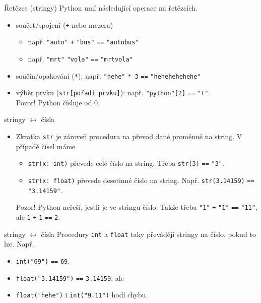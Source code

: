 \begin{frame}{Řetězce (stringy)}
 Python umí následující operace na řetězcích.
 \begin{itemize}
  \item<1-> součet/spojení (\texttt{+} nebo mezera)
   \begin{itemize}
    \item např. \texttt{"auto"} \texttt{+} \texttt{"bus"} \texttt{==}
     \texttt{"autobus"}
    \item např. \texttt{"mrt"} \texttt{"vola"} \texttt{==} \texttt{"mrtvola"}
   \end{itemize}
  \item<2-> součin/opakování (\texttt{*}): např. \texttt{"hehe"} \texttt{* 3}
   \texttt{==} \texttt{"hehehehehehe"}
  \item<3-> výběr prvku (\texttt{str[pořadí prvku]}): např. \texttt{"python"[2]}
   \texttt{==} \texttt{"t"}.\\
   \alert{Pozor!} Python čísluje od 0.
 \end{itemize}
\end{frame}

\begin{frame}{stringy $\leftrightarrow$ čísla}
 \begin{itemize}
  \item Zkratka \texttt{str} je zároveň procedura na převod dané proměnné na
   string. V případě čísel máme
   \begin{itemize}
    \item \texttt{str(x: int)} převede celé číslo na string. Třeba
     \texttt{str(3)} \texttt{==} \texttt{"3"}.
    \item \texttt{str(x: float)} převede desetinné číslo na string. Např. 
     \texttt{str(3.14159)} \texttt{==} \texttt{"3.14159"}.
   \end{itemize}
   \alert{Pozor!} Python neřeší, jestli je ve stringu číslo. Takže třeba
   \texttt{"1"} \texttt{+} \texttt{"1"} \texttt{==} \texttt{"11"}, ale
   \texttt{1} \texttt{+} \texttt{1} \texttt{==} \texttt{2}.
 \end{itemize}
\end{frame}

\begin{frame}{stringy $\leftrightarrow$ čísla}
 Procedury \texttt{int} a \texttt{float} taky převádějí stringy na číslo, pokud
 to lze. Např.
 \begin{itemize}
  \item<1-> \texttt{int("69")} \texttt{==} \texttt{69},
  \item<2-> \texttt{float("3.14159")} \texttt{==} \texttt{3.14159}, ale
  \item<3-> \texttt{float("hehe")} i \texttt{int("9.11")} hodí chybu.
 \end{itemize}
\end{frame}

